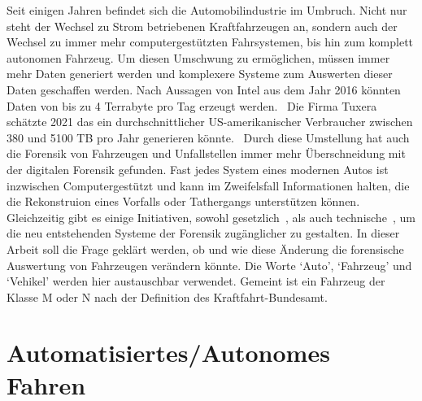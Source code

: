 \documentclass[conference,compsoc,final,a4paper]{IEEEtran}
\begin{document}
Seit einigen Jahren befindet sich die Automobilindustrie im Umbruch. Nicht nur steht der Wechsel zu Strom betriebenen Kraftfahrzeugen an,
sondern auch der Wechsel zu immer mehr computergestützten Fahrsystemen, bis hin zum komplett autonomen Fahrzeug.
Um diesen Umschwung zu ermöglichen, müssen immer mehr Daten generiert werden und komplexere Systeme zum Auswerten dieser Daten geschaffen werden.
Nach Aussagen von Intel aus dem Jahr 2016 könnten Daten von bis zu 4 Terrabyte pro Tag erzeugt werden.~\cite{Nelson2016}
Die Firma Tuxera schätzte 2021 das ein durchschnittlicher US-amerikanischer Verbraucher zwischen 380 und 5100 TB pro Jahr generieren könnte.~\cite{Wright2021}
Durch diese Umstellung hat auch die Forensik von Fahrzeugen und Unfallstellen immer mehr Überschneidung mit der digitalen Forensik gefunden.
Fast jedes System eines modernen Autos ist inzwischen Computergestützt und kann im Zweifelsfall Informationen halten, die die Rekonstruion eines Vorfalls oder Tathergangs unterstützen können.
Gleichzeitig gibt es einige Initiativen, sowohl gesetzlich~\cite{Boehm2020}, als auch technische~\cite{Hoque_2021a}\cite{Lee_2019}, um die neu entstehenden Systeme der Forensik zugänglicher zu gestalten.
In dieser Arbeit soll die Frage geklärt werden, ob und wie diese Änderung die forensische Auswertung von Fahrzeugen verändern könnte.
Die Worte `Auto', `Fahrzeug' und `Vehikel' werden hier austauschbar verwendet. Gemeint ist ein Fahrzeug der Klasse M oder N nach der Definition des Kraftfahrt-Bundesamt.

\section{Automatisiertes/Autonomes Fahren}
\end{document}

